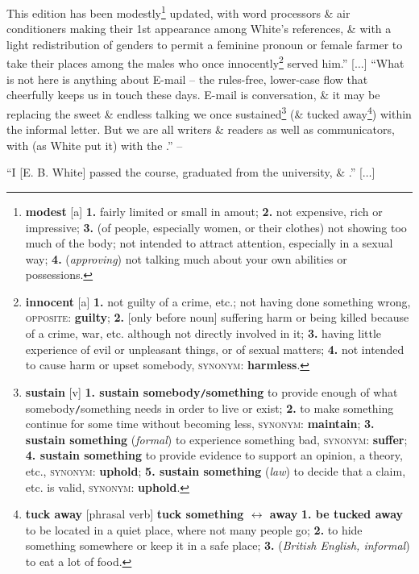 \documentclass{article}
\begin{document}
This edition has been modestly\footnote{{\bf modest} [a] {\bf 1.} fairly limited or small in amout; {\bf 2.} not expensive, rich or impressive; {\bf 3.} (of people, especially women, or their clothes) not showing too much of the body; not intended to attract attention, especially in a sexual way; {\bf 4.} ({\it approving}) not talking much about your own abilities or possessions.} updated, with word processors \& air conditioners making their 1st appearance among White's references, \& with a light redistribution of genders to permit a feminine pronoun or female farmer to take their places among the males who once innocently\footnote{{\bf innocent} [a] {\bf 1.} not guilty of a crime, etc.; not having done something wrong, \textsc{opposite}: {\bf guilty}; {\bf 2.} [only before noun] suffering harm or being killed because of a crime, war, etc. although not directly involved in it; {\bf 3.} having little experience of evil or unpleasant things, or of sexual matters; {\bf 4.} not intended to cause harm or upset somebody, \textsc{synonym}: {\bf harmless}.} served him.'' [$\ldots$] ``What is not here is anything about E-mail -- the rules-free, lower-case flow that cheerfully keeps us in touch these days. E-mail is conversation, \& it may be replacing the sweet \& endless talking we once sustained\footnote{{\bf sustain} [v] {\bf 1. sustain somebody{\tt/}something} to provide enough of what somebody{\tt/}something needs in order to live or exist; {\bf 2.} to make something continue for some time without becoming less, \textsc{synonym}: {\bf maintain}; {\bf 3. sustain something} ({\it formal}) to experience something bad, \textsc{synonym}: {\bf suffer}; {\bf 4. sustain something} to provide evidence to support an opinion, a theory, etc., \textsc{synonym}: {\bf uphold}; {\bf 5. sustain something} ({\it law}) to decide that a claim, etc. is valid, \textsc{synonym}: {\bf uphold}.} (\& tucked away\footnote{{\bf tuck away} [phrasal verb] {\bf tuck something $\leftrightarrow$ away} {\bf 1. be tucked away} to be located in a quiet place, where not many people go; {\bf 2.} to hide something somewhere or keep it in a safe place; {\bf 3.} ({\it British English, informal}) to eat a lot of food.}) within the informal letter. But we are all writers \& readers as well as communicators, with  (as White put it) with the .'' -- \cite[{\it Foreword} by Roger Angell]{Strunk_White2019}

``I [E. B. White] passed the course, graduated from the university, \& .'' [$\ldots$]
\end{document}
